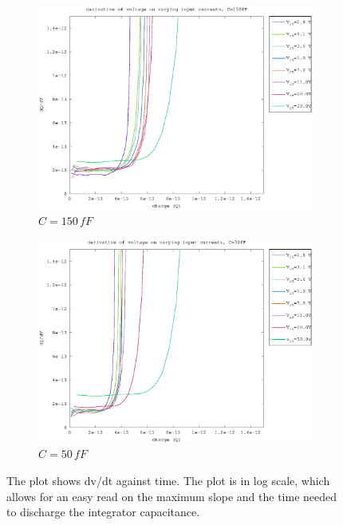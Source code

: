 \begin{figure}[h]
\begin{subfigure}[b]{0.475\textwidth}
	    \centering 
	    \includegraphics[width=\textwidth]{fig/d_slope_150fF.eps}
	    \caption[]%
	    {$C=150\,fF$}    
	    \label{fig:d_slopes_150fF}
	\end{subfigure}
	\quad
	\begin{subfigure}[b]{0.475\textwidth}   
	    \centering 
	    \includegraphics[width=\textwidth]{fig/d_slope_50fF.eps}
	    \caption[]%
	    {$C=50\,fF$}    
	    \label{fig:d_slopes_50fF}
	\end{subfigure}
	\caption{The plot shows dv/dt against time. The plot is in log scale, which allows for an easy read on the maximum slope and the time needed to discharge the integrator capacitance. }
	\label{fig:d_slopes}
\end{figure}



